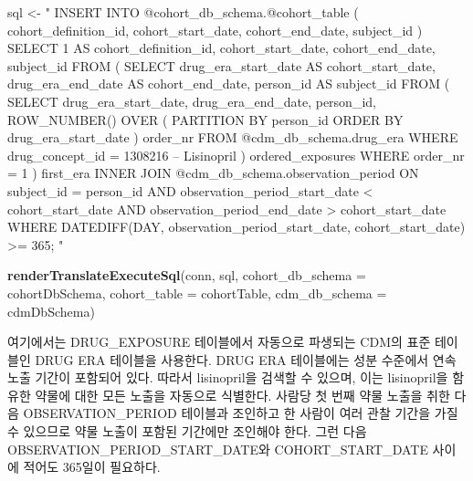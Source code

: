 \documentclass[11pt]{book}
\newenvironment{Shaded}{\begin{snugshade}}{\end{snugshade}}
\newcommand{\KeywordTok}[1]{\textcolor[rgb]{0.13,0.29,0.53}{\textbf{#1}}}
\newcommand{\DataTypeTok}[1]{\textcolor[rgb]{0.13,0.29,0.53}{#1}}
\newcommand{\StringTok}[1]{\textcolor[rgb]{0.31,0.60,0.02}{#1}}
\newcommand{\NormalTok}[1]{#1}
\theoremstyle{definition}
\theoremstyle{definition}
\theoremstyle{definition}
\theoremstyle{remark}
\begin{document}
\begin{Shaded}
\begin{Highlighting}[]
\NormalTok{sql <-}\StringTok{ "}
\StringTok{INSERT INTO @cohort_db_schema.@cohort_table (}
\StringTok{  cohort_definition_id,}
\StringTok{  cohort_start_date,}
\StringTok{  cohort_end_date,}
\StringTok{  subject_id}
\StringTok{)}
\StringTok{SELECT 1 AS cohort_definition_id,}
\StringTok{  cohort_start_date,}
\StringTok{  cohort_end_date,}
\StringTok{  subject_id}
\StringTok{FROM (}
\StringTok{  SELECT drug_era_start_date AS cohort_start_date,}
\StringTok{    drug_era_end_date AS cohort_end_date,}
\StringTok{    person_id AS subject_id}
\StringTok{  FROM (}
\StringTok{    SELECT drug_era_start_date,}
\StringTok{      drug_era_end_date,}
\StringTok{      person_id,}
\StringTok{      ROW_NUMBER() OVER (}
\StringTok{        PARTITION BY person_id}
\StringTok{            ORDER BY drug_era_start_date}
\StringTok{      ) order_nr}
\StringTok{    FROM @cdm_db_schema.drug_era}
\StringTok{    WHERE drug_concept_id = 1308216 -- Lisinopril}
\StringTok{  ) ordered_exposures}
\StringTok{  WHERE order_nr = 1}
\StringTok{) first_era}
\StringTok{INNER JOIN @cdm_db_schema.observation_period}
\StringTok{  ON subject_id = person_id}
\StringTok{    AND observation_period_start_date < cohort_start_date}
\StringTok{    AND observation_period_end_date > cohort_start_date}
\StringTok{WHERE DATEDIFF(DAY,}
\StringTok{               observation_period_start_date,}
\StringTok{               cohort_start_date) >= 365;}
\StringTok{"}

\KeywordTok{renderTranslateExecuteSql}\NormalTok{(conn, sql,}
                          \DataTypeTok{cohort_db_schema =}\NormalTok{ cohortDbSchema,}
                          \DataTypeTok{cohort_table =}\NormalTok{ cohortTable,}
                          \DataTypeTok{cdm_db_schema =}\NormalTok{ cdmDbSchema)}
\end{Highlighting}
\end{Shaded}

여기에서는 DRUG\_EXPOSURE 테이블에서 자동으로 파생되는 CDM의 표준
테이블인 DRUG ERA 테이블을 사용한다. DRUG ERA 테이블에는 성분 수준에서
연속 노출 기간이 포함되어 있다. 따라서 lisinopril을 검색할 수 있으며,
이는 lisinopril을 함유한 약물에 대한 모든 노출을 자동으로 식별한다.
사람당 첫 번째 약물 노출을 취한 다음 OBSERVATION\_PERIOD 테이블과
조인하고 한 사람이 여러 관찰 기간을 가질 수 있으므로 약물 노출이 포함된
기간에만 조인해야 한다. 그런 다음 OBSERVATION\_PERIOD\_START\_DATE와
COHORT\_START\_DATE 사이에 적어도 365일이 필요하다.
\end{document}
